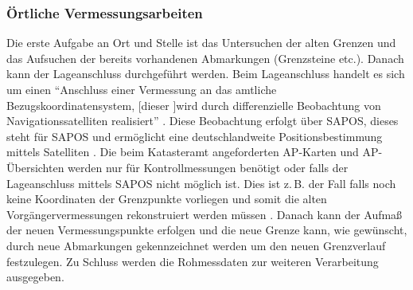 
\subsubsection{Örtliche Vermessungsarbeiten}

Die erste Aufgabe an Ort und Stelle ist das Untersuchen der alten Grenzen und das Aufsuchen der bereits vorhandenen Abmarkungen (Grenzsteine etc.).
Danach kann der Lageanschluss durchgeführt werden. Beim Lageanschluss handelt es sich um einen \enquote{Anschluss einer Vermessung an das amtliche Bezugskoordinatensystem, [dieser ]wird durch differenzielle Beobachtung von Navigationssatelliten realisiert} \autocite{bier-lage}.
Diese Beobachtung erfolgt über \acs{SAPOS}, dieses steht für \acl{SAPOS} und ermöglicht eine deutschlandweite Positionsbestimmung mittels Satelliten \autocite[vgl.][2]{sapos-prospekt}.
Die beim Katasteramt angeforderten AP-Karten und AP-Übersichten werden nur für Kontrollmessungen benötigt oder falls der Lageanschluss mittels \acs{SAPOS} nicht möglich ist.
Dies ist z.\,B. der Fall falls noch keine Koordinaten der Grenzpunkte vorliegen und somit die alten Vorgängervermessungen rekonstruiert werden müssen \autocite[vgl.][]{wolff-gps}. 
Danach kann der Aufmaß der neuen Vermessungspunkte erfolgen und 
die neue Grenze kann, wie gewünscht, durch neue Abmarkungen gekennzeichnet werden um den neuen Grenzverlauf festzulegen. Zu Schluss werden die Rohmessdaten zur weiteren Verarbeitung ausgegeben.

